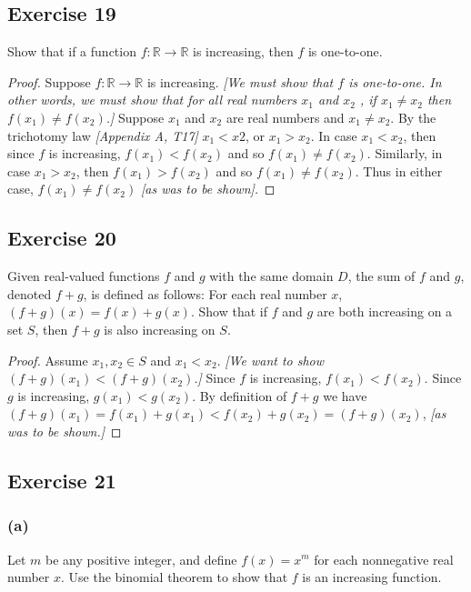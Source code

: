 \documentclass[14pt]{extarticle}
\newcommand{\R}{\mathbb{R}}
\begin{document}
\subsection{Exercise 19}
Show that if a function \(f: \R \to \R\) is increasing, then \(f\) is one-to-one.

\begin{proof}
Suppose \(f: \R \to \R\) is increasing. {\it [We must show that \(f\) is one-to-one. In other words, we must show that 
for all real numbers \(x_1\) and \(x_2\) , if \(x_1 \neq x_2\) then \(f(x_1) \neq f(x_2)\).]} Suppose \(x_1\) and \(x_2\) are 
real numbers and \(x_1 \neq x_2\). By the trichotomy law {\it [Appendix A, T17]} \(x_1 < x2\), or \(x_1 > x_2\). In case 
\(x_1 < x_2\), then since \(f\) is increasing, \(f(x_1) < f(x_2)\) and so \(f(x_1) \neq f(x_2)\). Similarly, in case 
\(x_1 > x_2\), then \(f(x_1) > f(x_2)\) and so \(f(x_1)\neq f(x_2)\). Thus in either case, \(f(x_1) \neq f(x_2)\) 
{\it [as was to be shown].}
\end{proof}

\subsection{Exercise 20}
Given real-valued functions \(f\) and \(g\) with the same domain \(D\), the sum of \(f\) and \(g\), denoted \(f + g\), 
is defined as follows: For each real number \(x\), \((f + g)(x) = f(x) + g(x)\). Show that if \(f\) and \(g\) are both 
increasing on a set \(S\), then \(f + g\) is also increasing on \(S\).

\begin{proof}
Assume \(x_1, x_2 \in S\) and \(x_1 < x_2\). {\it [We want to show \((f+g)(x_1) < (f+g)(x_2)\).]} Since \(f\) is increasing,
\(f(x_1) < f(x_2)\). Since \(g\) is increasing, \(g(x_1) < g(x_2)\). By definition of \(f+g\) we have \((f+g)(x_1) = 
f(x_1) + g(x_1) < f(x_2) + g(x_2) = (f+g)(x_2)\), {\it [as was to be shown.]}
\end{proof}

\subsection{Exercise 21}
\subsubsection{(a)}
Let \(m\) be any positive integer, and define \(f(x) = x^m\) for each nonnegative real number \(x\). Use the binomial 
theorem to show that \(f\) is an increasing function.
\end{document}
